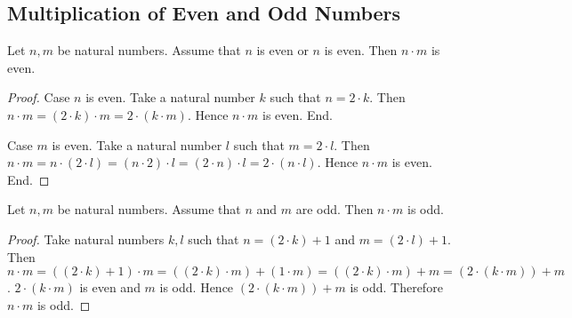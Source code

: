 \documentclass[10pt]{article}
\begin{document}
  \subsection*{Multiplication of Even and Odd Numbers}

  \begin{forthel}
    \begin{proposition}
      Let $n, m$ be natural numbers.
      Assume that $n$ is even or $n$ is even.
      Then $n \cdot m$ is even.
    \end{proposition}
    \begin{proof}
      Case $n$ is even.
        Take a natural number $k$ such that $n = 2 \cdot k$.
        Then $n \cdot m
          = (2 \cdot k) \cdot m
          = 2 \cdot (k \cdot m)$.
        Hence $n \cdot m$ is even.
      End.

      Case $m$ is even.
        Take a natural number $l$ such that $m = 2 \cdot l$.
        Then $n \cdot m
          = n \cdot (2 \cdot l)
          = (n \cdot 2) \cdot l
          = (2 \cdot n) \cdot l
          = 2 \cdot (n \cdot l)$.
        Hence $n \cdot m$ is even.
      End.
    \end{proof}
  \end{forthel}

  \begin{forthel}
    \begin{proposition}
      Let $n, m$ be natural numbers.
      Assume that $n$ and $m$ are odd.
      Then $n \cdot m$ is odd.
    \end{proposition}
    \begin{proof}
      Take natural numbers $k, l$ such that $n = (2 \cdot k) + 1$ and $m = (2 \cdot l) + 1$.
      Then $n \cdot m
        = ((2 \cdot k) + 1) \cdot m
        = ((2 \cdot k) \cdot m) + (1 \cdot m)
        = ((2 \cdot k) \cdot m) + m
        = (2 \cdot (k \cdot m)) + m$.
      $2 \cdot (k \cdot m)$ is even and $m$ is odd.
      Hence $(2 \cdot (k \cdot m)) + m$ is odd.
      Therefore $n \cdot m$ is odd.
    \end{proof}
  \end{forthel}
\end{document}
